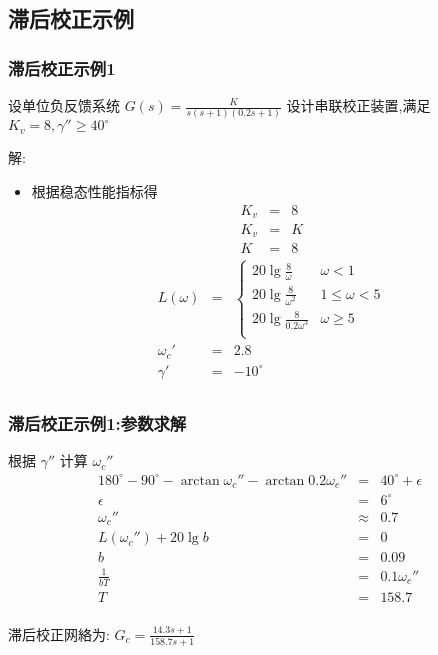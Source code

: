 \documentclass[table]{article}
\begin{document}
\subsection{滞后校正示例}
\label{sec-3-2}
\begin{frame}
\frametitle{滞后校正示例1}
\label{sec-3-2-1}

设单位负反馈系统 $G(s)=\frac{K}{s(s+1)(0.2s+1)}$ 设计串联校正装置,满足  $K_v=8, \gamma''\geq 40^{\circ}$ 

解:

\begin{itemize}
\item <2->根据稳态性能指标得
      \begin{eqnarray*}
      K_v & = &8 \\
      K_v &= & K \\
       K &=& 8
      \end{eqnarray*}
      \begin{eqnarray*}
      L(\omega) & = & \begin{cases}20\lg\frac{8}{\omega} & \omega <1 \\
                                   20\lg\frac{8}{\omega^2} & 1\leq \omega < 5 \\
                                   20\lg\frac{8}{0.2\omega^3} &  \omega \geq 5 \\  \end{cases}\\
      \omega_c' &=& 2.8 \\
      \gamma' &=& -10^{\circ} \\
      \end{eqnarray*}
\end{itemize}
\end{frame}
\begin{frame}
\frametitle{滞后校正示例1:参数求解}
\label{sec-3-2-2}

根据  $\gamma''$  计算  $\omega_c''$ 
\begin{eqnarray*}
180^{\circ}-90^{\circ}-\arctan\omega_c''-\arctan0.2\omega_c'' & = & 40^{\circ}+\epsilon\\
\epsilon &=& 6^{\circ} \\
\omega_c'' &\approx& 0.7 \\
L(\omega_c'') +20\lg b&=& 0 \\
b &=& 0.09 \\
\frac{1}{bT} &=& 0.1\omega_c''\\
T &=& 158.7 \\
\end{eqnarray*}

滞后校正网絡为:  $G_c=\frac{14.3s+1}{158.7s+1}$ 
\end{frame}
\end{document}
